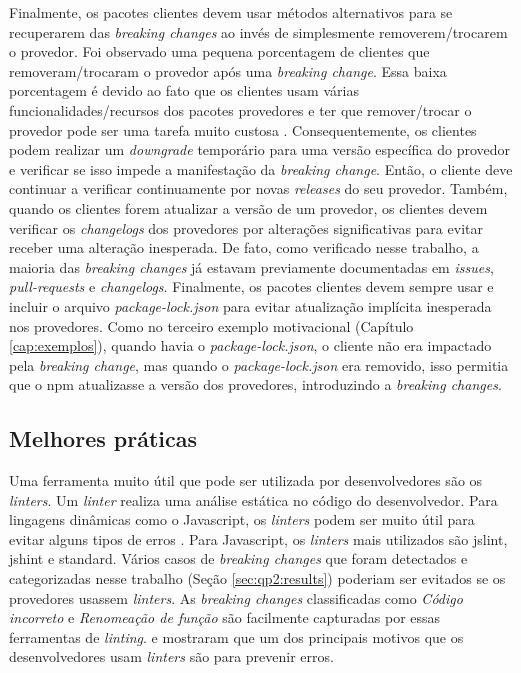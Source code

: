 Finalmente, os pacotes clientes devem usar métodos alternativos para se recuperarem das \textit{breaking changes} ao invés de simplesmente removerem/trocarem o provedor. Foi observado uma pequena porcentagem de clientes que removeram/trocaram o provedor após uma \textit{breaking change}. Essa baixa porcentagem é devido ao fato que os clientes usam várias funcionalidades/recursos dos pacotes provedores e ter que remover/trocar o provedor pode ser uma tarefa muito custosa \cite{automating_detecting_third-part_java_migration}. Consequentemente, os clientes podem realizar um \textit{downgrade} temporário para uma versão específica do provedor e verificar se isso impede a manifestação da \textit{breaking change}. Então, o cliente deve continuar a verificar continuamente por novas \textit{releases} do seu provedor. Também, quando os clientes forem atualizar a versão de um provedor, os clientes devem verificar os \textit{changelogs} dos provedores por alterações significativas para evitar receber uma alteração inesperada. De fato, como verificado nesse trabalho, a maioria das \textit{breaking changes} já estavam previamente documentadas em \textit{issues}, \textit{pull-requests} e \textit{changelogs}. Finalmente, os pacotes clientes devem sempre usar e incluir o arquivo \textit{package-lock.json} para evitar atualização implícita inesperada nos provedores. Como no terceiro exemplo motivacional (Capítulo \ref{cap:exemplos}), quando havia o \textit{package-lock.json}, o cliente não era impactado pela \textit{breaking change}, mas quando o \textit{package-lock.json} era removido, isso permitia que o \textsf{npm} atualizasse a versão dos provedores, introduzindo a \textit{breaking changes}.

\subsection{Melhores práticas}
\label{sub:disc:2}

Uma ferramenta muito útil que pode ser utilizada por desenvolvedores são os \textit{linters}. Um \textit{linter} realiza uma análise estática no código do desenvolvedor. Para lingagens dinâmicas como o \textsf{Javascript}, os \textit{linters} podem ser muito útil para evitar alguns tipos de erros \cite{js-linters}. Para \textsf{Javascript}, os \textit{linters} mais utilizados são \textsf{jslint}, \textsf{jshint} e \textsf{standard}. Vários casos de \textit{breaking changes} que foram detectados e categorizadas nesse trabalho (Seção \ref{sec:qp2:results}) poderiam ser evitados se os provedores usassem \textit{linters}. As \textit{breaking changes} classificadas como \textit{Código incorreto} e \textit{Renomeação de função} são facilmente capturadas por essas ferramentas de \textit{linting}.  e  mostraram que um dos principais motivos que os desenvolvedores usam \textit{linters} são para prevenir erros.

